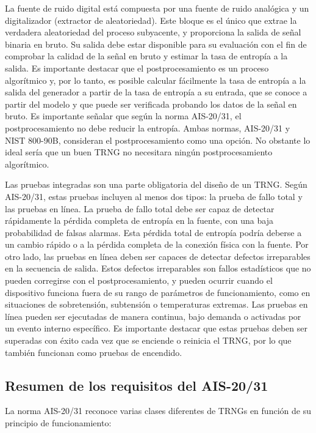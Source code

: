            La fuente de ruido digital está compuesta por una fuente de ruido analógica y un digitalizador (extractor de aleatoriedad). Este bloque es el único que extrae la verdadera aleatoriedad del proceso subyacente, y proporciona la salida de señal binaria en bruto. Su salida debe estar disponible para su evaluación con el fin de comprobar la calidad de la señal en bruto y estimar la tasa de entropía a la salida. Es importante destacar que el postprocesamiento es un proceso algorítmico y, por lo tanto, es posible calcular fácilmente la tasa de entropía a la salida del generador a partir de la tasa de entropía a su entrada, que se conoce a partir del modelo y que puede ser verificada probando los datos de la señal en bruto. Es importante señalar que según la norma AIS-20/31, el postprocesamiento no debe reducir la entropía. Ambas normas, AIS-20/31 y NIST 800-90B, consideran el postprocesamiento como una opción. No obstante lo ideal sería que un buen TRNG no necesitara ningún postprocesamiento algorítmico.

            Las pruebas integradas son una parte obligatoria del diseño de un TRNG. Según AIS-20/31, estas pruebas incluyen al menos dos tipos: la prueba de fallo total y las pruebas en línea. La prueba de fallo total debe ser capaz de detectar rápidamente la pérdida completa de entropía en la fuente, con una baja probabilidad de falsas alarmas. Esta pérdida total de entropía podría deberse a un cambio rápido o a la pérdida completa de la conexión física con la fuente. Por otro lado, las pruebas en línea deben ser capaces de detectar defectos irreparables en la secuencia de salida. Estos defectos irreparables son fallos estadísticos que no pueden corregirse con el postprocesamiento, y pueden ocurrir cuando el dispositivo funciona fuera de su rango de parámetros de funcionamiento, como en situaciones de sobretensión, subtensión o temperaturas extremas. Las pruebas en línea pueden ser ejecutadas de manera continua, bajo demanda o activadas por un evento interno específico. Es importante destacar que estas pruebas deben ser superadas con éxito cada vez que se enciende o reinicia el TRNG, por lo que también funcionan como pruebas de encendido. \cite{Petura2019}

                \subsection{Resumen de los requisitos del AIS-20/31}

            La norma AIS-20/31 reconoce varias clases diferentes de TRNGs en función de su principio de funcionamiento:
            
